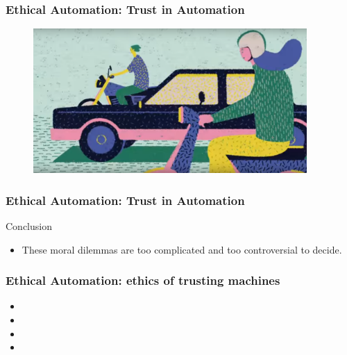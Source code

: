 \begin{frame}
  \frametitle{ Ethical Automation: Trust in Automation}
  \begin{figure}[bht]
    \centering
    \includegraphics[width=4.1in]{diagrams/image01}
    \caption{}
    \label{fig:-deg}
  \end{figure}
\end{frame}


\begin{frame}
  \frametitle{ Ethical Automation: Trust in Automation}
  {\Large Conclusion}
  \begin{itemize}
  \item These moral dilemmas are too complicated and too controversial to decide.
  \end{itemize}
\end{frame}


\begin{frame}
  \frametitle{ Ethical Automation: ethics of trusting machines }
  \begin{itemize}
  \item
    
    
  \item 
    
  \item
    
  \item 
    
  \end{itemize}
\end{frame}
